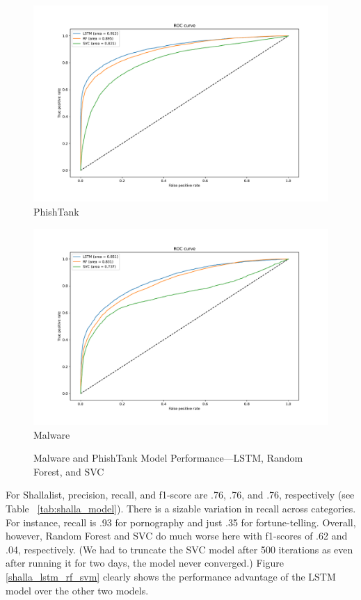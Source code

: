 \documentclass[12pt, letterpaper]{article}
\begin{document}
\begin{figure}[!htb]
\centering
\caption{Malware and PhishTank Model Performance---LSTM, Random Forest, and SVC}\label{phishtank_malware_comp}
	\begin{minipage}[b]{0.45\textwidth}
	\centering
	\label{phish_compare}
	\includegraphics[width=\textwidth]{../figs/roc-phish-2017-lstm-rf-svc.pdf}\\PhishTank
	\end{minipage}
	\begin{minipage}[b]{0.45\textwidth}
	\centering
	\label{malware_compare}
	\includegraphics[width=\textwidth]{../figs/roc-malware-lstm-rf-svc.pdf}\\Malware
	\end{minipage}
\end{figure}

For Shallalist, precision, recall, and f1-score are .76, .76, and .76, respectively (see Table ~\ref{tab:shalla_model}). There is a sizable variation in recall across categories. For instance, recall is .93 for pornography and just .35 for fortune-telling. Overall, however, Random Forest and SVC do much worse here with f1-scores of .62 and .04, respectively. (We had to truncate the SVC model after 500 iterations as even after running it for two days, the model never converged.) Figure \ref{shalla_lstm_rf_svm} clearly shows the performance advantage of the LSTM model over the other two models.
\end{document}
